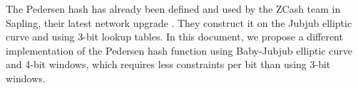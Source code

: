 
The Pedersen hash has already been defined and used by the ZCash team in Sapling,
their latest network upgrade \cite{sapling}.
They construct it on {\color{purple}the} Jubjub elliptic curve and using 3-bit lookup tables.
In this document, we propose a {\color{purple}different} implementation of the Pedersen hash function
using Baby-Jubjub elliptic curve and 4-bit windows, which requires less constraints per bit than using 3-bit windows.
